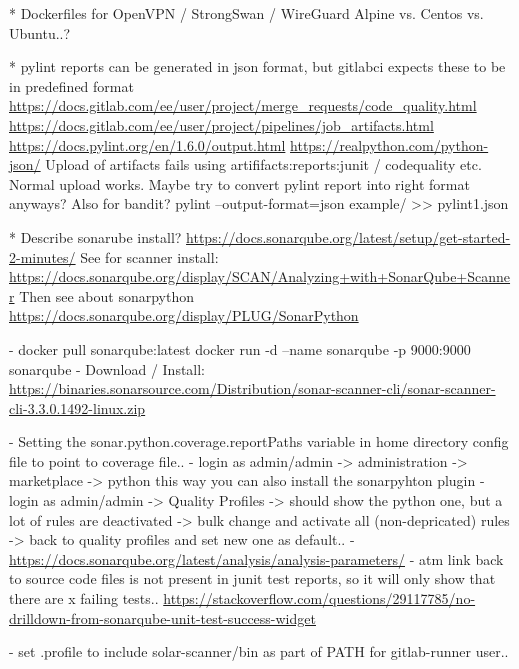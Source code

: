 * Dockerfiles for OpenVPN / StrongSwan / WireGuard
Alpine vs. Centos vs. Ubuntu..?


* pylint reports can be generated in json format, but gitlabci expects these to be in predefined format 
\url{https://docs.gitlab.com/ee/user/project/merge_requests/code_quality.html}
\url{https://docs.gitlab.com/ee/user/project/pipelines/job_artifacts.html}
\url{https://docs.pylint.org/en/1.6.0/output.html}
\url{https://realpython.com/python-json/}
Upload of artifacts fails using artififacts:reports:junit / codequality etc. Normal upload works. 
Maybe try to convert pylint report into right format anyways? Also for bandit?
pylint --output-format=json example/ >> pylint1.json 

* Describe sonarube install? \url{https://docs.sonarqube.org/latest/setup/get-started-2-minutes/}
  See for scanner install: \url{https://docs.sonarqube.org/display/SCAN/Analyzing+with+SonarQube+Scanner}
  Then see about sonarpython \url{https://docs.sonarqube.org/display/PLUG/SonarPython}
 
 - docker pull sonarqube:latest
   docker run -d --name sonarqube -p 9000:9000 sonarqube
 - Download / Install:  \url{https://binaries.sonarsource.com/Distribution/sonar-scanner-cli/sonar-scanner-cli-3.3.0.1492-linux.zip}
 
 - Setting the sonar.python.coverage.reportPaths variable in home directory config file to point to coverage file..
 - login as admin/admin -> administration -> marketplace -> python this way you can also install the sonarpyhton plugin
 - login as admin/admin -> Quality Profiles -> should show the python one, but a lot of rules are deactivated
   -> bulk change and activate all (non-depricated) rules -> back to quality profiles and set new one as default..
 - \url{https://docs.sonarqube.org/latest/analysis/analysis-parameters/}
 - atm link back to source code files is not present in junit test reports, so it will only show that there are x failing tests..
   \url{https://stackoverflow.com/questions/29117785/no-drilldown-from-sonarqube-unit-test-success-widget}
   
 - set .profile to include solar-scanner/bin as part of PATH for gitlab-runner user..
 
\fi %